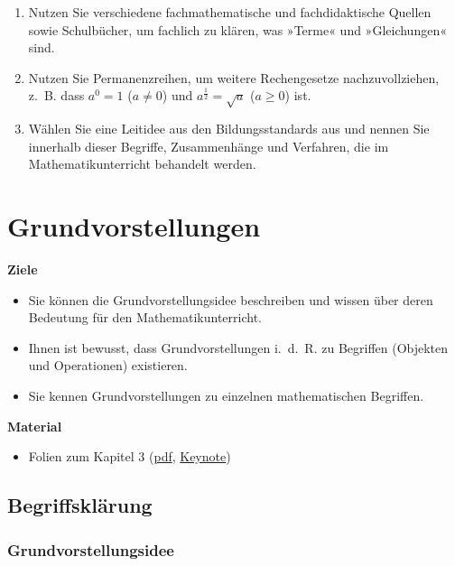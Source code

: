 \documentclass[
]{scrbook}
\providecommand{\tightlist}{%
  \setlength{\itemsep}{0pt}\setlength{\parskip}{0pt}}
\renewenvironment{quote}{
  \list{}{
	\leftmargin0.2cm   %
    \rightmargin\leftmargin
      	\def\FrameCommand
    {%
        {\color{quoteColor}\vrule width 2pt}%
        \hspace{0pt}%
    }%
    \MakeFramed{\advance \hsize -\width \FrameRestore}    \color{quoteColor}
    }
  \item\relax
}
{\endlist\color{black}\endMakeFramed}
\theoremstyle{definition}
\theoremstyle{definition}
\theoremstyle{definition}
\theoremstyle{definition}
\theoremstyle{remark}
\begin{document}
\begin{enumerate}
\def\labelenumi{\arabic{enumi}.}
\tightlist
\item
  Nutzen Sie verschiedene fachmathematische und fachdidaktische Quellen sowie Schulbücher, um fachlich zu klären, was »Terme« und »Gleichungen« sind.
\item
  Nutzen Sie Permanenzreihen, um weitere Rechengesetze nachzuvollziehen, z.~B. dass \(a^0 = 1\) (\(a\neq 0\)) und \(a^\frac{1}{2} = \sqrt{a}\) (\(a \geq 0\)) ist.
\item
  Wählen Sie eine Leitidee aus den Bildungsstandards aus und nennen Sie innerhalb dieser Begriffe, Zusammenhänge und Verfahren, die im Mathematikunterricht behandelt werden.
\end{enumerate}

\chapter{Grundvorstellungen}\label{grundvorstellungen}

\begin{quote}
\textbf{Ziele}

\begin{itemize}
\tightlist
\item
  Sie können die Grundvorstellungsidee beschreiben und wissen über deren Bedeutung für den Mathematikunterricht.
\item
  Ihnen ist bewusst, dass Grundvorstellungen i.~d.~R. zu Begriffen (Objekten und Operationen) existieren.
\item
  Sie kennen Grundvorstellungen zu einzelnen mathematischen Begriffen.
\end{itemize}

\textbf{Material}

\begin{itemize}
\tightlist
\item
  Folien zum Kapitel 3 (\href{files/Stoffdidaktik2024-03-Grundvorstellungen.pdf}{pdf}, \href{files/Stoffdidaktik2024-03-Grundvorstellungen.key}{Keynote})
\end{itemize}
\end{quote}

\section{Begriffsklärung}\label{grundvorstellungen-begriffsklaerung}

\subsection{Grundvorstellungsidee}\label{grundvorstellungsidee}
\end{document}
